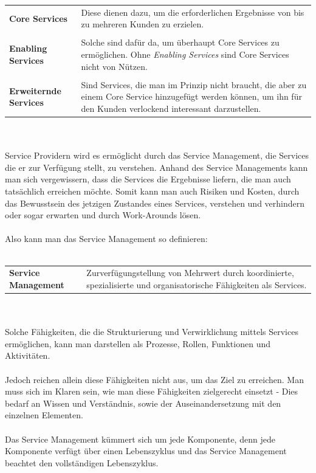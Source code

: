 {\begin{tabular}{l | p{10cm}}
    \textbf{Core Services} & Diese dienen dazu, um die erforderlichen Ergebnisse von bis zu mehreren Kunden zu erzielen. \\ \\
    \textbf{Enabling Services} & Solche sind dafür da, um überhaupt Core Services zu ermöglichen. Ohne \emph{Enabling Services} sind Core Services nicht von Nützen. \\ \\
    \textbf{Erweiternde Services} & Sind Services, die man im Prinzip nicht braucht, die aber zu einem Core Service hinzugefügt werden können, um ihn für den Kunden verlockend interessant darzustellen.
\end{tabular}
\leavevmode
\\ \\
Service Providern wird es ermöglicht durch das Service Management, die Services die er zur Verfügung stellt, zu verstehen.
Anhand des Service Managements kann man sich vergewissern, dass die Services die Ergebnisse liefern, die man auch tatsächlich erreichen möchte.
Somit kann man auch Risiken und Kosten, durch das Bewusstsein des jetzigen Zustandes eines Services, verstehen und verhindern oder sogar erwarten und durch Work-Arounds lösen.
\\ \\
Also kann man das Service Management so definieren:
\\ \\
\begin{tabular}{l | p{10cm}}
    \textbf{Service Management} & Zurverfügungstellung von Mehrwert durch koordinierte, spezialisierte und organisatorische Fähigkeiten als Services.
\end{tabular}
\\ \\
Solche Fähigkeiten, die die Strukturierung und Verwirklichung mittels Services ermöglichen, kann man darstellen als Prozesse, Rollen, Funktionen und Aktivitäten.
\\ \\
Jedoch reichen allein diese Fähigkeiten nicht aus, um das Ziel zu erreichen. Man muss sich im Klaren sein, wie man diese Fähigkeiten zielgerecht einsetzt -
Dies bedarf an Wissen und Verständnis, sowie der Auseinandersetzung mit den einzelnen Elementen.
\\ \\
Das Service Management kümmert sich um jede Komponente, denn jede Komponente verfügt über einen Lebenszyklus und das Service Management beachtet den vollständigen Lebenszyklus.

}

